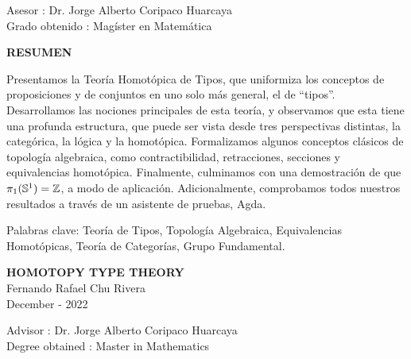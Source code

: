 \documentclass[12pt]{report}
\theoremstyle{definition}
\theoremstyle{plain}
\begin{document}
\noindent Asesor \hspace{1.74cm} : Dr. Jorge Alberto Coripaco Huarcaya \\
Grado obtenido \hspace{0.1cm} : Mag\'ister en Matem\'atica \\[1cm]

\vspace{1.5cm}

\begin{center}
    \textbf{RESUMEN}\\[1cm]
\end{center}

\noindent Presentamos la Teor\'ia Homot\'opica de Tipos, que uniformiza los conceptos de proposiciones y de conjuntos en uno solo m\'as general, el de ``tipos''.
Desarrollamos las nociones principales de esta teor\'ia, y observamos que esta tiene una profunda estructura, que puede ser vista desde tres perspectivas distintas, la categ\'orica, la l\'ogica y la homot\'opica. Formalizamos algunos conceptos cl\'asicos de topolog\'ia algebraica, como contractibilidad, retracciones, secciones y equivalencias homot\'opica.
Finalmente, culminamos con una demostraci\'on de que $\pi_1(\mathbb{S}^1)=\mathbb{Z}$, a modo de aplicaci\'on.
Adicionalmente, comprobamos todos nuestros resultados a trav\'es de un asistente de pruebas, Agda.

\vspace{1cm}
\noindent Palabras clave: Teor\'ia de Tipos, Topolog\'ia Algebraica, Equivalencias Homot\'opicas, Teor\'ia de Categor\'ias, Grupo Fundamental.



\newpage
{}
\begin{center}
    \textbf{HOMOTOPY TYPE THEORY} \\[0.4cm]
    Fernando Rafael Chu Rivera \\[0.4cm]
    December - 2022 \\[0.7cm]
\end{center}

\noindent Advisor \hspace{1.64cm} : Dr. Jorge Alberto Coripaco Huarcaya \\
Degree obtained \hspace{0.1cm} : Master in Mathematics \\[1cm]

\vspace{1.5cm}
\end{document}
